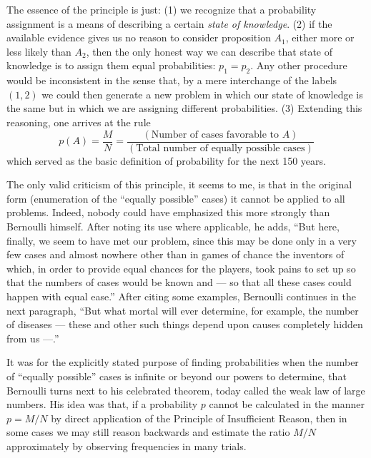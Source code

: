 The essence of the principle is just:
(1) we recognize that a probability assignment is a means of describing a certain \emph{state of knowledge}.
(2) if the available evidence gives us no reason to consider proposition $A_1$, either more or less likely than $A_2$, then the only honest way we can describe that state of knowledge is to assign them equal probabilities: $p_1 = p_2$.
Any other procedure would be inconsistent in the sense that, by a mere interchange of the labels $(1, 2)$ we could then generate a new problem in which our state of knowledge is the same but in which we are assigning different probabilities.
(3) Extending this reasoning, one arrives at the rule
\begin{equation}
	\label{A1}
	p(A) = \frac{M}{N} = \frac{(\text{Number of cases favorable to }A)}{(\text{Total number of equally possible cases})}
\end{equation}
which served as the basic definition of probability for the next 150 years.

The only valid criticism of this principle, it seems to me,	is that in the original form (enumeration of the ``equally possible'' cases) it cannot be applied to all problems.
Indeed, nobody could have emphasized this more strongly than Bernoulli himself.
After noting its use where applicable, he adds, ``But here, finally, we seem to have met our problem, since this may be done only in a very few cases and almost nowhere other than in games of chance the inventors of which, in order to provide equal chances for the players, took pains to set up so that the numbers of cases would be known and --- so that all these cases could happen with equal ease.''
After citing some examples, Bernoulli continues in the next paragraph, ``But what mortal will ever determine, for example, the number of diseases --- these and other such things depend upon causes completely hidden from us ---.''

It was for the explicitly stated purpose of finding probabilities when the number of ``equally possible'' cases is infinite or beyond our powers to determine, that Bernoulli turns next to his celebrated theorem, today called the weak law of large numbers.
His idea was that, if a probability $p$ cannot be calculated in the manner $p=M/N$ by direct application of the Principle of Insufficient Reason, then in some cases we may still reason backwards and estimate the ratio $M/N$ approximately by observing frequencies in many trials.

